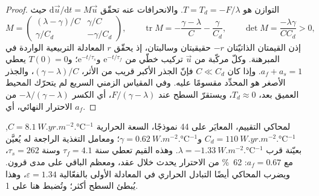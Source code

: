 \begin{proof}
التوازن هو $T = T_d = -F/\lambda$. والانحرافات عنه تحقّق
$\mathrm d\vec u/\mathrm dt = M\vec u$ حيث
\[
M = \begin{pmatrix} (\lambda - \gamma)/C & \gamma/C\\ \gamma/C_d &
-\gamma/C_d\end{pmatrix}, \qquad
\operatorname{tr}M = -\frac{\gamma - \lambda}{C} - \frac{\gamma}{C_d},
\qquad \det M = \frac{-\lambda\gamma}{CC_d} > 0 ,
\]
إذن القيمتان الذاتيّتان $-r$ حقيقيتان وسالبتان، إذ يحقّق $r$ المعادلة التربيعية
الواردة في المبرهنة. وكلّ مركّبة من $\vec u$ تركيب خطّي من $\mathrm
e^{-t/\tau_f}$ و$\mathrm e^{-t/\tau_s}$؛ و$T(0) = 0$ يعطي $a_f + a_s =
1$. وإذا كان $C \ll C_d$ فإنّ الجذر الأكبر قريب من الأثر، $(\gamma -
\lambda)/C$، والجذر الأصغر هو المحدِّد مقسومًا عليه. وفي المقياس
الزمني السريع لم يتحرّك المحيط العميق بعد، $T_d \approx 0$، ويستقرّ السطح
عند $F/(\gamma - \lambda)$، أي الكسر $-\lambda/(\gamma - \lambda)$
من الاحترار النهائي، أي $a_f$.
\end{proof}

لمحاكي التقييم، المعايَر على 44 نموذجًا، السعة الحرارية $C =
\qty{8.1}{W.yr.m^{-2}.\celsius^{-1}}$, $C_d = \qty{110}{W.yr.m^{-2}.\celsius^{-1}}$
و$\gamma = \qty{0.62}{W.m^{-2}.\celsius^{-1}}$؛ ومعامل التغذية الراجعة له
يُعيَّن بعيّنة قرب $\lambda = \qty{-1.33}{W.m^{-2}.\celsius^{-1}}$. وهذه القيم
تعطي $\tau_f = \num{4.1}\text{ سنة}$ و$\tau_s = \num{262}\text{ سنة}$، مع $a_f =
0.67$: \qty{62}{\percent} من الاحترار يحدث خلال عقد، ومعظم
الباقي على مدى قرون. ويضرب المحاكي أيضًا التبادل الحراري في المعادلة الأولى
بالفعّالية $\varepsilon = 1.34$، وهذا يُبطئ السطح
أكثر؛ وتُضبط هنا على 1.

